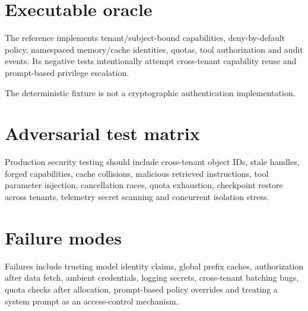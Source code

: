 \section{Executable oracle}
The reference implements tenant/subject-bound capabilities, deny-by-default policy, namespaced memory/cache identities, quotas, tool authorization and audit events. Its negative tests intentionally attempt cross-tenant capability reuse and prompt-based privilege escalation.

The deterministic fixture is not a cryptographic authentication implementation.

\section{Adversarial test matrix}
Production security testing should include cross-tenant object IDs, stale handles, forged capabilities, cache collisions, malicious retrieved instructions, tool parameter injection, cancellation races, quota exhaustion, checkpoint restore across tenants, telemetry secret scanning and concurrent isolation stress.

\section{Failure modes}
Failures include trusting model identity claims, global prefix caches, authorization after data fetch, ambient credentials, logging secrets, cross-tenant batching bugs, quota checks after allocation, prompt-based policy overrides and treating a system prompt as an access-control mechanism.

